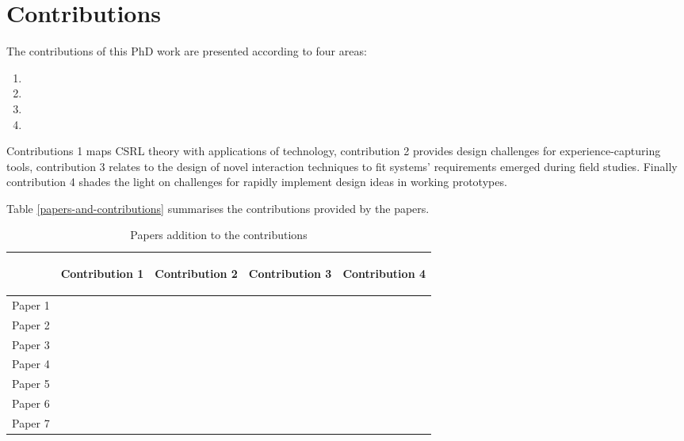 \chapter{Contributions}\label{contributions}


The contributions of this PhD work are presented according to four areas:

\begin{enumerate}
	\def\labelenumi{\arabic{enumi}.} 
	\itemsep1pt\parskip0pt 
	\item \Ci 
	\item \Cii 
	\item \Ciii 
	\item \Civ
\end{enumerate}

Contributions 1 maps CSRL theory with applications of technology, contribution 2 provides design challenges for experience-capturing tools, contribution 3 relates to the design of novel interaction techniques to fit systems' requirements emerged during field studies. Finally contribution 4 shades the light on challenges for rapidly implement design ideas in working prototypes.

Table \ref{papers-and-contributions} summarises the contributions provided by the papers.

\begin{table}[tbh] 
	\centering 
	\caption{Papers addition to the contributions} 
	\label{tab:design-challenges} 
	\smallskip
	\begin{tabular}{@{}lcccc@{}}
	\toprule
	  & \begin{turn}{90}Contribution 1\end{turn} & \begin{turn}{90}Contribution 2\end{turn} & \begin{turn}{90}Contribution 3\end{turn} & \begin{turn}{90}Contribution 4\end{turn} \\
	\midrule
	Paper 1 & & & \textbullet & \\
	Paper 2 & \textbullet & \textbullet & & \\
	Paper 3 & & \textbullet & \textbullet & \textbullet \\
	Paper 4 & \textbullet & & & \\
	Paper 5 & & & \textbullet & \textbullet \\
	Paper 6 & \textbullet & & & \\
	Paper 7 & & & & \textbullet \\
	\bottomrule 
	\end{tabular}
\end{table}

